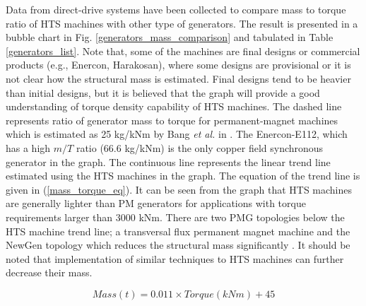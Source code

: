 \documentclass[final,peerreview,onecolumn]{IEEEtran}
\begin{document}
Data from direct-drive systems have been collected to compare mass to torque ratio of HTS machines with other type of generators. The result is presented in a bubble chart in Fig. \ref{generators_mass_comparison} and tabulated in Table \ref{generators_list}.  Note that, some of the machines are final designs or commercial products (e.g., Enercon, Harakosan), where some designs are provisional or it is not clear how the structural mass is estimated. Final designs tend to be heavier than initial designs, but it is believed that the graph will provide a good understanding of torque density capability of HTS machines.  The dashed line represents ratio of generator mass to torque for permanent-magnet machines which is estimated as 25 kg/kNm by Bang \textit{et al.} in \cite{Bang2008}. The Enercon-E112, which has a high $m/T$ ratio (66.6 kg/kNm) is the only copper field synchronous generator in the graph. The continuous line represents the linear trend line estimated using the HTS machines in the graph. The equation of the trend line is given in (\ref{mass_torque_eq}). It can be seen from the graph that HTS machines are generally lighter than PM generators for applications with torque requirements larger than 3000 kNm. There are two PMG topologies below the HTS machine trend line; a transversal flux permanent magnet machine \cite{Bang2009} and the NewGen topology which reduces the structural mass significantly \cite{Engstrom2004}. It should be noted that implementation of similar techniques to HTS machines can further decrease their mass. 

 \begin{equation}
     Mass(t)=0.011\times Torque(kNm)+45
     \label{mass_torque_eq}
 \end{equation}
\end{document}
